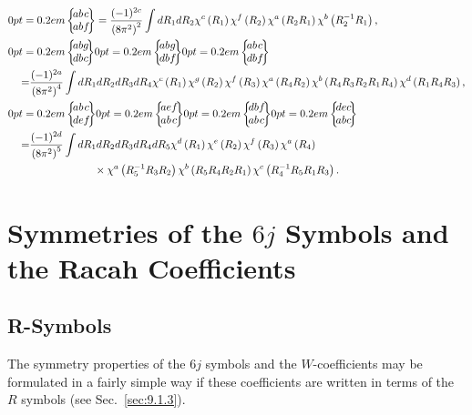 \begin{align}
\MoveEqLeft{\sixj{a}{b}{c}{a}{b}{f}=\frac{(-1)^{2 c}}{\left(8 \pi^{2}\right)^{2}} \int d R_{1} d R_{2} \chi^{c}\left(R_{1}\right) \chi^{f}\left(R_{2}\right) \chi^{a}\left(R_{2} R_{1}\right) \chi^{b}\left(R_{2}^{-1} R_{1}\right),}  \label{eq:9:3:2}\\
\MoveEqLeft{\sixj{a}{b}{g}{d}{b}{c}\sixj{a}{b}{g}{d}{b}{f}\sixj{a}{b}{c}{d}{b}{f} } \notag\\
=&\frac{(-1)^{2 a}}{\left(8 \pi^{2}\right)^{4}} \int d R_{1} d R_{2} d R_{3} d R_{4} \chi^{c}\left(R_{1}\right) \chi^{g}\left(R_{2}\right) \chi^{f}\left(R_{3}\right) \chi^{a}\left(R_{4} R_{2}\right) \chi^{b}\left(R_{4} R_{3} R_{2} R_{1} R_{4}\right) \chi^{d}\left(R_{1} R_{4} R_{3}\right),  \label{eq:9:3:3}\\
\MoveEqLeft{\sixj{a}{b}{c}{d}{e}{f}\sixj{a}{e}{f}{a}{b}{c}\sixj{d}{b}{f}{a}{b}{c}\sixj{d}{e}{c}{a}{b}{c}}  \notag\\
=&\frac{(-1)^{2 d}}{\left(8 \pi^{2}\right)^{5}} \int d R_{1} d R_{2} d R_{3} d R_{4} d R_{5} \chi^{d}\left(R_{1}\right) \chi^{e}\left(R_{2}\right) \chi^{f}\left(R_{3}\right) \chi^{a}\left(R_{4}\right) 
\notag\\&\qquad\qquad \qquad\times
\chi^{a}\left(R_{5}^{-1} R_{3} R_{2}\right) \chi^{b}\left(R_{5} R_{4} R_{2} R_{1}\right) \chi^{c}\left(R_{4}^{-1} R_{5} R_{1} R_{3}\right). \label{eq:9:3:4}
\end{align}
\section{Symmetries of the $6 j$ Symbols and the Racah Coefficients}\label{sec:9.4}
\subsection{R-Symbols}\label{sec:9.4.1}
The symmetry properties of the $6 j$ symbols and the $W$-coefficients may be formulated in a fairly simple way if these coefficients are written in terms of the $R$ symbols (see Sec.~\ref{sec:9.1.3}).

